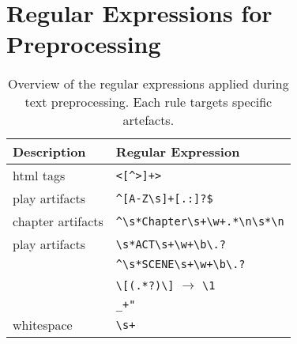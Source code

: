 
\chapter{Regular Expressions for Preprocessing}
\label{app:regex_preproc}

\begin{table}[H]%
  \caption[Regular expressions applied during text preprocessing]{Overview of the regular expressions applied during text preprocessing. 
            Each rule targets specific artefacts.}
  \label{tab:regex}%
  \centering\small
  \begin{tabular}{@{}ll@{}} %
    \toprule
    \textbf{Description} & \textbf{Regular Expression}  \\
    \midrule
            html tags             & \verb|<[^>]+>| \\
            play artifacts        & \verb|^[A-Z\s]+[.:]?$| \\
            chapter artifacts     & \verb|^\s*Chapter\s+\w+.*\n\s*\n| \\
            play artifacts        & \verb|\s*ACT\s+\w+\b\.?| \\
                                  & \verb|^\s*SCENE\s+\w+\b\.?| \\
                                  & \verb|\[(.*?)\]| $\rightarrow$ \verb|\1| \\
                                  & \verb|_+"| \\
            whitespace           & \verb|\s+| \\


    \bottomrule
  \end{tabular}
\end{table}
